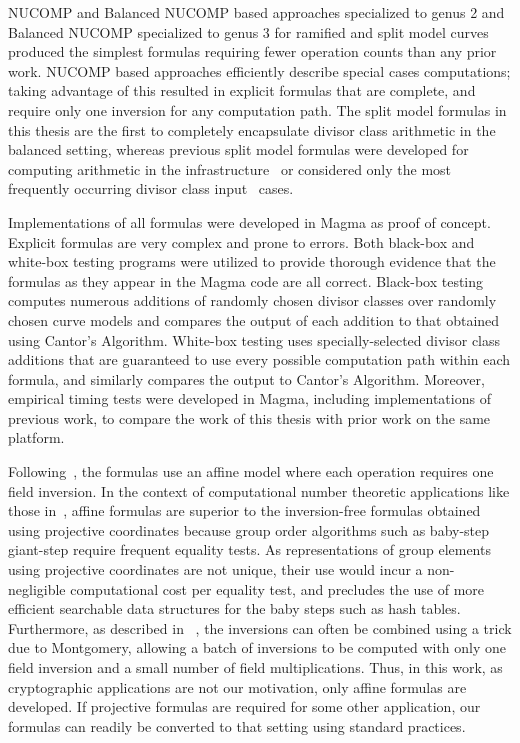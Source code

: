 NUCOMP and Balanced NUCOMP based approaches specialized to genus 2 and Balanced
NUCOMP specialized to genus 3 for ramified and split model curves produced the
simplest formulas requiring fewer operation counts than any prior work. NUCOMP
based approaches efficiently describe special cases computations; taking
advantage of this resulted in explicit formulas that are complete, and require
only one inversion for any computation path. The split model formulas in this
thesis are the first to completely encapsulate divisor class arithmetic in the
balanced setting, whereas previous split model formulas were developed for
computing arithmetic in the
infrastructure~\cite{EricksonJacobsonStein_realg2_2011, rad2019jacobian} or
considered only the most frequently occurring divisor class
input~\cite{Sutherland_g3_2019} cases.

Implementations of all formulas were developed in Magma as proof of concept.
Explicit formulas are very complex and prone to errors. Both black-box and
white-box testing programs were utilized to provide thorough evidence that the
formulas as they appear in the Magma code are all correct. Black-box testing
computes numerous additions of randomly chosen divisor classes over randomly
chosen curve models and compares the output of each addition to that obtained
using Cantor's Algorithm. White-box testing uses specially-selected divisor
class additions that are guaranteed to use every possible computation path
within each formula, and similarly compares the output to Cantor's Algorithm.
Moreover, empirical timing tests were developed in Magma, including
implementations of previous work, to compare the work of this thesis with prior
work on the same platform.

Following~\cite{Sutherland_g3_2019}, the formulas use an affine model where each
operation requires one field inversion. In the context of computational number
theoretic applications like those in~\cite{Kedlaya_lseries_2008}, affine
formulas are superior to the inversion-free formulas obtained using projective
coordinates because group order algorithms such as baby-step giant-step require
frequent equality tests. As representations of group elements using projective
coordinates are not unique, their use would incur a non-negligible computational
cost per equality test, and precludes the use of more efficient searchable data
structures for the baby steps such as hash tables. Furthermore, as described in
~\cite{Sutherland_g3_2019}, the inversions can often be combined using a trick
due to Montgomery, allowing a batch of inversions to be computed with only one
field inversion and a small number of field multiplications. Thus, in this work,
as cryptographic applications are not our motivation, only affine formulas are
developed. If projective formulas are required for some other application, our
formulas can readily be converted to that setting using standard practices.

